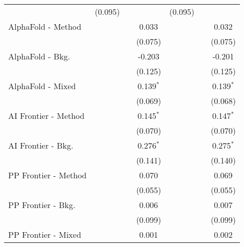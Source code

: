 \begin{tabular}{lcccccc}
                                & (0.095)       &              &              & (0.095)       &              &   \\   
   AlphaFold - Method           &               &              & 0.033        &               &              & 0.032\\   
                                &               &              & (0.075)      &               &              & (0.075)\\   
   AlphaFold - Bkg.             &               &              & -0.203       &               &              & -0.201\\   
                                &               &              & (0.125)      &               &              & (0.125)\\   
   AlphaFold - Mixed            &               &              & 0.139$^{*}$  &               &              & 0.139$^{*}$\\   
                                &               &              & (0.069)      &               &              & (0.068)\\   
   AI Frontier - Method         &               &              & 0.145$^{*}$  &               &              & 0.147$^{*}$\\   
                                &               &              & (0.070)      &               &              & (0.070)\\   
   AI Frontier - Bkg.           &               &              & 0.276$^{*}$  &               &              & 0.275$^{*}$\\   
                                &               &              & (0.141)      &               &              & (0.140)\\   
   PP Frontier - Method         &               &              & 0.070        &               &              & 0.069\\   
                                &               &              & (0.055)      &               &              & (0.055)\\   
   PP Frontier - Bkg.           &               &              & 0.006        &               &              & 0.007\\   
                                &               &              & (0.099)      &               &              & (0.099)\\   
   PP Frontier - Mixed          &               &              & 0.001        &               &              & 0.002\\   

\end{tabular}
